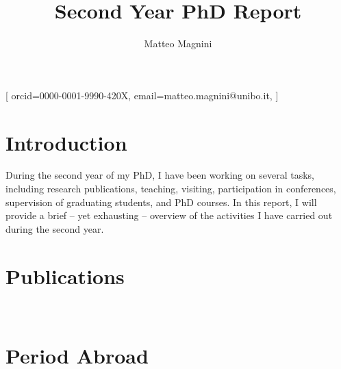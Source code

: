 \documentclass[
]{ceurart}
\begin{document}


\title{Second Year PhD Report}


\author[1]{Matteo Magnini}[%
orcid=0000-0001-9990-420X,
email=matteo.magnini@unibo.it,
]

\address[1]{Department of Computer Science and Engineering, University of Bologna, Via dell'Università 50, Cesena, Italy}



\maketitle

\section{Introduction}
\label{sec:introduction}

During the second year of my PhD, I have been working on several tasks, including research publications, teaching, visiting, participation in conferences, supervision of graduating students, and PhD courses.
%
In this report, I will provide a brief -- yet exhausting -- overview of the activities I have carried out during the second year.

\section{Publications}
\label{sec:publications}

~\cite{DBLP:journals/csur/CiattoSAMO24}

\section{Period Abroad}
\label{sec:period-abroad}
\end{document}
